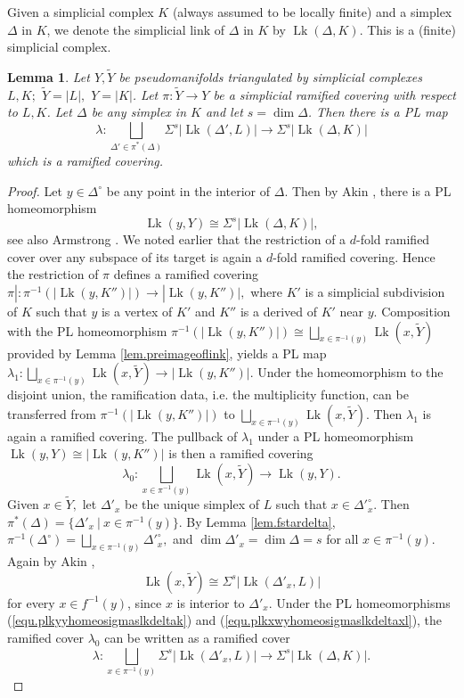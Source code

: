 \documentclass{amsart}
\newtheorem{lemma}[thm]{Lemma}
\theoremstyle{definition}
\theoremstyle{remark}
\newcommand {\wY}    {{\ensuremath{\widetilde{Y}}}}
\newcommand {\Lk}    {{\ensuremath{\operatorname{Lk}}}}
\begin{document}
Given a simplicial complex $K$ (always assumed to be locally finite) 
and a simplex $\Delta$ in $K$,
we denote the simplicial link of $\Delta$ in $K$ by $\Lk (\Delta, K)$.
This is a (finite) simplicial complex.
\begin{lemma} \label{lem.restrramcovonlinks}
Let $Y,\wY$ be pseudomanifolds triangulated by simplicial complexes
$L,K;$ $\wY = |L|,$ $Y= |K|$.
Let $\pi: \wY \to Y$ be a simplicial ramified covering with respect to $L,K$.
Let $\Delta$ be any simplex in $K$ and let $s=\dim \Delta$.
Then there is a PL map 
\[ \lambda: \bigsqcup_{\Delta' \in \pi^* (\Delta)} \Sigma^s |\Lk (\Delta',L)|
  \longrightarrow \Sigma^s |\Lk (\Delta,K)|    \]
which is a ramified covering.
\end{lemma}
\begin{proof}
Let $y\in \Delta^\circ$ be any point in the interior of $\Delta$.
Then by Akin \cite[p. 420, c $\to$ a]{akin}, 
there is a PL homeomorphism
\begin{equation} \label{equ.plkyyhomeosigmaslkdeltak}
\Lk (y,Y) \cong \Sigma^s |\Lk (\Delta, K)|, 
\end{equation}
see also  Armstrong \cite[p. 178]{armstrong}.
We noted earlier that the restriction of a $d$-fold ramified cover over
any subspace of its target is again a $d$-fold ramified covering.
Hence the restriction of $\pi$ defines a ramified covering
$\pi|: \pi^{-1} (|\Lk (y,K'')|) \to |\Lk (y,K'')|,$
where $K'$ is a simplicial subdivision of $K$ such that $y$ is a vertex 
of $K'$ and $K''$ is a derived of $K'$ near $y$.
Composition with the PL homeomorphism
$\pi^{-1} (|\Lk (y,K'')|) \cong \bigsqcup_{x\in \pi^{-1} (y)} \Lk (x,\wY)$
provided by Lemma \ref{lem.preimageoflink},
yields a PL map
$\lambda_1: \bigsqcup_{x\in \pi^{-1} (y)} \Lk (x,\wY) \to  
     |\Lk (y,K'')|.$
Under the homeomorphism to the disjoint union, the ramification data,
i.e. the multiplicity function, can be transferred from
$\pi^{-1} (|\Lk (y,K'')|)$ to $\bigsqcup_{x\in \pi^{-1} (y)} \Lk (x,\wY)$.
Then $\lambda_1$ is again a ramified covering.
The pullback of $\lambda_1$ under a PL homeomorphism
$\Lk (y,Y) \cong |\Lk (y,K'')|$ is then a ramified covering
\[ \lambda_0: \bigsqcup_{x\in \pi^{-1} (y)} \Lk (x,\wY) \longrightarrow  
     \Lk (y,Y).  \]
Given $x\in \wY,$ let $\Delta'_x$ be the unique simplex
of $L$ such that $x\in \Delta'^\circ_x$.
Then 
$\pi^* (\Delta) = \{ \Delta'_x ~|~ x \in \pi^{-1} (y) \}.$
By Lemma \ref{lem.fstardelta},
$\pi^{-1} (\Delta^\circ) = 
      \bigsqcup_{x\in \pi^{-1} (y)} \Delta'^\circ_x,$
and
$\dim \Delta'_x = \dim \Delta =s$ for all $x\in \pi^{-1} (y).$
Again by Akin \cite[p. 420, c $\to$ a]{akin},
\begin{equation} \label{equ.plkxwyhomeosigmaslkdeltaxl} 
\Lk (x,\wY) \cong \Sigma^s |\Lk (\Delta'_x, L)| 
\end{equation}
for every $x\in f^{-1} (y)$, since $x$ is interior to $\Delta'_x$.
Under the PL homeomorphisms
(\ref{equ.plkyyhomeosigmaslkdeltak}) and
(\ref{equ.plkxwyhomeosigmaslkdeltaxl}),
the ramified cover $\lambda_0$ can be written as a ramified cover
\[ \lambda: \bigsqcup_{x\in \pi^{-1} (y)} \Sigma^s |\Lk (\Delta'_x, L)| 
  \longrightarrow \Sigma^s |\Lk (\Delta, K)|.  \]
\end{proof}
\end{document}
